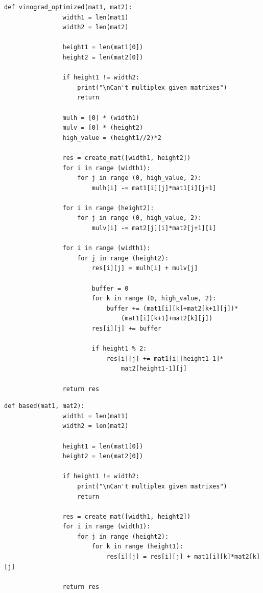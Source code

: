 \documentclass[a4paper,12pt]{report}
\begin{document}
	    \begin{lstlisting}[frame = single, breaklines, caption = Оптимизированный алгоритм Винограда, label=list:wino_opt]
	        def vinograd_optimized(mat1, mat2):
	        	width1 = len(mat1)
	        	width2 = len(mat2)
	        
	        	height1 = len(mat1[0])
	        	height2 = len(mat2[0])
	        
	        	if height1 != width2:
	        		print("\nCan't multiplex given matrixes")
	        		return
	        
	        	mulh = [0] * (width1)
	        	mulv = [0] * (height2)
	        	high_value = (height1//2)*2
	        
	        	res = create_mat([width1, height2])
	        	for i in range (width1):
	        		for j in range (0, high_value, 2):
	        			mulh[i] -= mat1[i][j]*mat1[i][j+1]
	        
	        	for i in range (height2):
	        		for j in range (0, high_value, 2):
	        			mulv[i] -= mat2[j][i]*mat2[j+1][i]
	        
	        	for i in range (width1):
	        		for j in range (height2):
	        			res[i][j] = mulh[i] + mulv[j]
	        
	        			buffer = 0
	        			for k in range (0, high_value, 2):
	        				buffer += (mat1[i][k]+mat2[k+1][j])*
	        					(mat1[i][k+1]+mat2[k][j])
	        			res[i][j] += buffer
	        
	        			if height1 % 2:
	        				res[i][j] += mat1[i][height1-1]*
	        					mat2[height1-1][j]
	        
	        	return res
	    \end{lstlisting}
	    
	    \begin{lstlisting}[frame = single, breaklines, caption = Стандартный алгоритм умножения матриц, label=list:std]
	        def based(mat1, mat2):
	        	width1 = len(mat1)
	        	width2 = len(mat2)
	        
	        	height1 = len(mat1[0])
	        	height2 = len(mat2[0])
	        
	        	if height1 != width2:
	        		print("\nCan't multiplex given matrixes")
	        		return
	        
	        	res = create_mat([width1, height2])
	        	for i in range (width1):
	        		for j in range (height2):
	        			for k in range (height1):
	        				res[i][j] = res[i][j] + mat1[i][k]*mat2[k][j]
	        
	        	return res
        \end{lstlisting}
        
\end{document}
